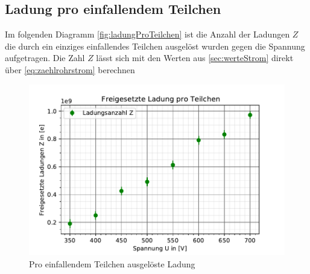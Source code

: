 \subsection{Ladung pro einfallendem Teilchen}
\label{sec:ladung}
Im folgenden Diagramm \autoref{fig:ladungProTeilchen} ist die Anzahl der Ladungen $Z$ die durch ein einziges einfallendes Teilchen ausgelöst
wurden gegen die Spannung aufgetragen. Die Zahl $Z$ lässt sich mit den Werten aus \autoref{sec:werteStrom} 
direkt über \autoref{eq:zaehlrohrstrom} berechnen
\begin{figure}
  \centering
  \includegraphics{ladungproteilchen.pdf}
  \caption{Pro einfallendem Teilchen ausgelöste Ladung}
  \label{fig:ladungProTeilchen}
\end{figure}
